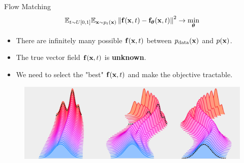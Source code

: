 \documentclass{beamer}
\begin{document}
\begin{frame}{Flow Matching}
	\[
		\mathbb{E}_{t \sim U[0, 1]} \mathbb{E}_{\mathbf{x} \sim p_t(\mathbf{x})}\left\| \mathbf{f}(\mathbf{x}, t) - \mathbf{f}_{\boldsymbol{\theta}}(\mathbf{x}, t) \right\|^2 \rightarrow \min_{\boldsymbol{\theta}}
	\]
	\vspace{-0.5cm}
	\begin{itemize}
		\item There are infinitely many possible $\mathbf{f}(\mathbf{x}, t)$ between $p_{\text{data}}(\mathbf{x})$ and $p(\mathbf{x})$.
		\item The true vector field  $\mathbf{f}(\mathbf{x}, t)$ is \textbf{unknown}.
		\item We need to select the "best" $\mathbf{f}(\mathbf{x}, t)$ and make the objective tractable.
	\end{itemize}
	\begin{figure}
		\centering
		\includegraphics[width=\linewidth]{figs/multiple_dynamics}
	\end{figure}
\end{frame}
\end{document}
